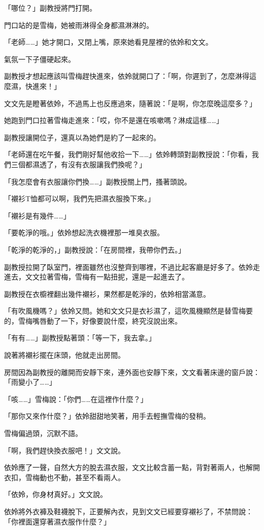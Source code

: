 「哪位？」副教授將門打開。

門口站的是雪梅，她被雨淋得全身都濕淋淋的。

「老師……」她才開口，又閉上嘴，原來她看見屋裡的依姈和文文。

氣氛一下子僵硬起來。

副教授才想起應該叫雪梅趕快進來，依姈就開口了：「啊，你遲到了，怎麼淋得這麼濕，快進來！」

文文先是瞪著依姈，不過馬上也反應過來，隨著說：「是啊，你怎麼晚這麼多？」

她跑到門口拉著雪梅走進來：「哎，你不是還在咳嗽嗎？淋成這樣……」

副教授讓開位子，還真以為她們是約了一起來的。

「老師還在吃午餐，我們剛好幫他收拾一下……」依姈轉頭對副教授說：「你看，我們三個都濕透了，有沒有衣服讓我們換呢？」

「我怎麼會有衣服讓你們換……」副教授關上門，搔著頭說。

「襯衫T恤都可以啊，我們先把濕衣服換下來。」

「襯衫是有幾件……」

「要乾淨的哦。」依姈想起洗衣機裡那一堆臭衣服。

「乾淨的乾淨的，」副教授說：「在房間裡，我帶你們去。」

副教授拉開了臥室門，裡面雖然也沒整齊到哪裡，不過比起客廳是好多了。依姈走進去，文文拉著雪梅，雪梅有一點扭抳，還是一起進去了。

副教授在衣櫥裡翻出幾件襯衫，果然都是乾淨的，依姈相當滿意。

「有吹風機嗎？」依姈又問。她和文文只是衣衫濕了，這吹風機顯然是替雪梅要的，雪梅嘴唇動了一下，好像要說什麼，終究沒說出來。

「有有……」副教授點著頭：「等一下，我去拿。」

說著將襯衫擺在床頭，他就走出房間。

房間因為副教授的離開而安靜下來，連外面也安靜下來，文文看著床邊的窗戶說：「雨變小了……」

「咳……」雪梅說：「你們……在這裡作什麼？」

「那你又來作什麼？」依姈甜甜地笑著，用手去輕撫雪梅的發稍。

雪梅偏過頭，沉默不語。

「啊，我們趕快換衣服吧！」文文說。

依姈應了一聲，自然大方的脫去濕衣服，文文比較含蓄一點，背對著兩人，也解開衣扣，雪梅動也不動，甚至不看兩人。

「依姈，你身材真好。」文文說。

依姈將外衣褲及鞋襪脫下，正要解內衣，見到文文已經要穿襯衫了，不禁問說：「你裡面還穿著濕衣服作什麼？」


